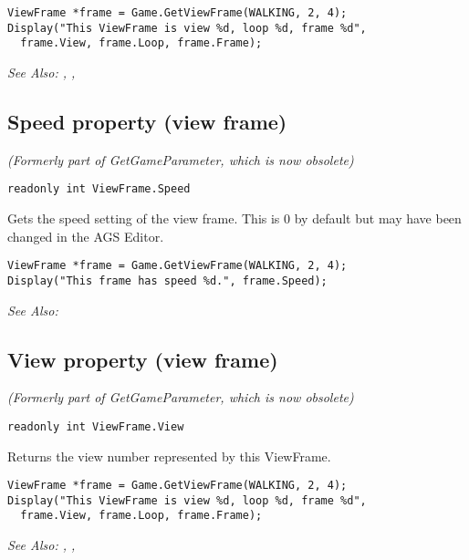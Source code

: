 \begin{verbatim}
ViewFrame *frame = Game.GetViewFrame(WALKING, 2, 4);
Display("This ViewFrame is view %d, loop %d, frame %d",
  frame.View, frame.Loop, frame.Frame);
\end{verbatim}

\it{See Also:} ,
,


\subsection{Speed property (view frame)}\label{ViewFrame.Speed}%

\it{(Formerly part of GetGameParameter, which is now obsolete)}

\begin{verbatim}
readonly int ViewFrame.Speed
\end{verbatim}
Gets the speed setting of the view frame. This is 0 by default but may have been changed
in the AGS Editor.

\begin{verbatim}
ViewFrame *frame = Game.GetViewFrame(WALKING, 2, 4);
Display("This frame has speed %d.", frame.Speed);
\end{verbatim}

\it{See Also:} 


\subsection{View property (view frame)}\label{ViewFrame.View}%

\it{(Formerly part of GetGameParameter, which is now obsolete)}

\begin{verbatim}
readonly int ViewFrame.View
\end{verbatim}
Returns the view number represented by this ViewFrame.

\begin{verbatim}
ViewFrame *frame = Game.GetViewFrame(WALKING, 2, 4);
Display("This ViewFrame is view %d, loop %d, frame %d",
  frame.View, frame.Loop, frame.Frame);
\end{verbatim}

\it{See Also:} ,
,



